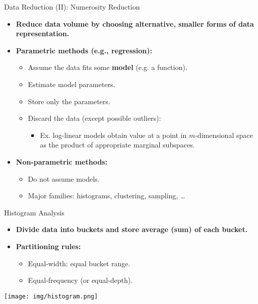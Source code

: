 \begin{frame}{Data Reduction (II): Numerosity Reduction}
	\begin{itemize}
		\item \textbf{Reduce data volume by choosing alternative,
			      {\color{airforceblue}smaller} forms of data representation.}
		\item \textbf{{\color{airforceblue}Parametric} methods (e.g.,
			      regression):}
		      \begin{itemize}
			      \item Assume the data fits some
			            \textbf{{\color{airforceblue}model}} (e.g. a function).
			      \item Estimate model parameters.
			      \item Store only the parameters.
			      \item Discard the data (except possible outliers):
			            \begin{itemize}
				            \item Ex. log-linear models obtain value at a point in
				                  $m$-dimensional space as the product of appropriate marginal
				                  subspaces.
			            \end{itemize}
		      \end{itemize}
		\item \textbf{{\color{airforceblue}Non-parametric} methods:}
		      \begin{itemize}
			      \item Do not assume models.
			      \item Major families: histograms, clustering, sampling, \ldots
		      \end{itemize}
	\end{itemize}
\end{frame}

\begin{frame}{Histogram Analysis}
	\begin{itemize}
		\item \textbf{Divide data into buckets and store average (sum) of each
			      bucket.}
		\item \textbf{Partitioning rules:}
		      \begin{itemize}
			      \item Equal-width: equal bucket range.
			      \item Equal-frequency (or equal-depth).
		      \end{itemize}
	\end{itemize}
	\centering
	\texttt{[image: img/histogram.png]}
\end{frame}

